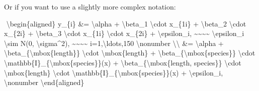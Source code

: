 \documentclass[
  letterpaper,
  DIV=11,
  numbers=noendperiod]{scrartcl}
\newenvironment{Shaded}{\begin{snugshade}}{\end{snugshade}}
\newcommand{\ExtensionTok}[1]{\textcolor[rgb]{0.00,0.23,0.31}{#1}}
\newcommand{\KeywordTok}[1]{\textcolor[rgb]{0.00,0.23,0.31}{#1}}
\newcommand{\NormalTok}[1]{\textcolor[rgb]{0.00,0.23,0.31}{#1}}
\newcommand{\SpecialCharTok}[1]{\textcolor[rgb]{0.37,0.37,0.37}{#1}}
\newcommand{\SpecialStringTok}[1]{\textcolor[rgb]{0.13,0.47,0.30}{#1}}
\begin{document}
\begin{tcolorbox}
Or if you want to use a slightly more complex notation:

\begin{Shaded}
\begin{Highlighting}[]
\SpecialStringTok{$$}
\KeywordTok{\textbackslash{}begin}\NormalTok{\{}\ExtensionTok{aligned}\NormalTok{\}}
\SpecialStringTok{y\_\{i\} \&= }\SpecialCharTok{\textbackslash{}alpha}\SpecialStringTok{ + }\SpecialCharTok{\textbackslash{}beta}\SpecialStringTok{\_1 }\SpecialCharTok{\textbackslash{}cdot}\SpecialStringTok{ x\_\{1i\} + }\SpecialCharTok{\textbackslash{}beta}\SpecialStringTok{\_2 }\SpecialCharTok{\textbackslash{}cdot}\SpecialStringTok{ x\_\{2i\} + }\SpecialCharTok{\textbackslash{}beta}\SpecialStringTok{\_3 }\SpecialCharTok{\textbackslash{}cdot}\SpecialStringTok{ x\_\{1i\} }\SpecialCharTok{\textbackslash{}cdot}\SpecialStringTok{ x\_\{2i\} + }\SpecialCharTok{\textbackslash{}epsilon}\SpecialStringTok{\_i, \textasciitilde{}\textasciitilde{}\textasciitilde{}\textasciitilde{} }\SpecialCharTok{\textbackslash{}epsilon}\SpecialStringTok{\_i }\SpecialCharTok{\textbackslash{}sim}\SpecialStringTok{ N(0, }\SpecialCharTok{\textbackslash{}sigma}\SpecialStringTok{\^{}2), \textasciitilde{}\textasciitilde{}\textasciitilde{}\textasciitilde{} i=1,}\SpecialCharTok{\textbackslash{}ldots}\SpecialStringTok{,150 }\SpecialCharTok{\textbackslash{}nonumber}\SpecialStringTok{ }\SpecialCharTok{\textbackslash{}\textbackslash{}}
\SpecialStringTok{\&= }\SpecialCharTok{\textbackslash{}alpha}\SpecialStringTok{ + }\SpecialCharTok{\textbackslash{}beta}\SpecialStringTok{\_\{}\SpecialCharTok{\textbackslash{}mbox}\NormalTok{\{length\}}\SpecialStringTok{\} }\SpecialCharTok{\textbackslash{}cdot}\SpecialStringTok{ }\SpecialCharTok{\textbackslash{}mbox}\NormalTok{\{length\}}\SpecialStringTok{ + }\SpecialCharTok{\textbackslash{}beta}\SpecialStringTok{\_\{}\SpecialCharTok{\textbackslash{}mbox}\NormalTok{\{species\}}\SpecialStringTok{\} }\SpecialCharTok{\textbackslash{}cdot}\SpecialStringTok{ }\SpecialCharTok{\textbackslash{}mathbb}\SpecialStringTok{\{I\}\_\{}\SpecialCharTok{\textbackslash{}mbox}\NormalTok{\{species\}}\SpecialStringTok{\}(x) + }\SpecialCharTok{\textbackslash{}beta}\SpecialStringTok{\_\{}\SpecialCharTok{\textbackslash{}mbox}\NormalTok{\{length, species\}}\SpecialStringTok{\} }\SpecialCharTok{\textbackslash{}cdot}\SpecialStringTok{ }\SpecialCharTok{\textbackslash{}mbox}\NormalTok{\{length\}}\SpecialStringTok{ }\SpecialCharTok{\textbackslash{}cdot}\SpecialStringTok{ }\SpecialCharTok{\textbackslash{}mathbb}\SpecialStringTok{\{I\}\_\{}\SpecialCharTok{\textbackslash{}mbox}\NormalTok{\{species\}}\SpecialStringTok{\}(x) + }\SpecialCharTok{\textbackslash{}epsilon}\SpecialStringTok{\_i, }\SpecialCharTok{\textbackslash{}nonumber}
\KeywordTok{\textbackslash{}end}\NormalTok{\{}\ExtensionTok{aligned}\NormalTok{\}}
\SpecialStringTok{$$}
\end{Highlighting}
\end{Shaded}


\end{tcolorbox}
\end{document}
